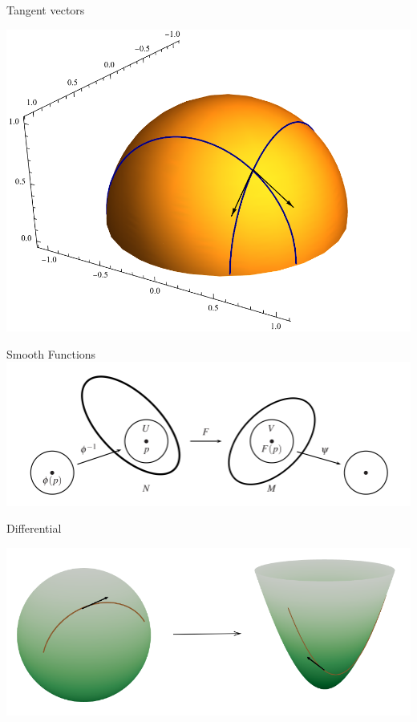 \documentclass[9pt]{beamer}
\begin{document}
\begin{frame}{Tangent vectors}
\begin{center}
    \includegraphics[scale=0.4]{uppersphere.png}
\end{center}
\end{frame}

\begin{frame}{Smooth Functions}
    \includegraphics[scale=0.55]{smooth_function.PNG}
\end{frame}



\begin{frame}{Differential}

    \includegraphics[scale=0.6]{differential.PNG}
\end{frame}
\end{document}
